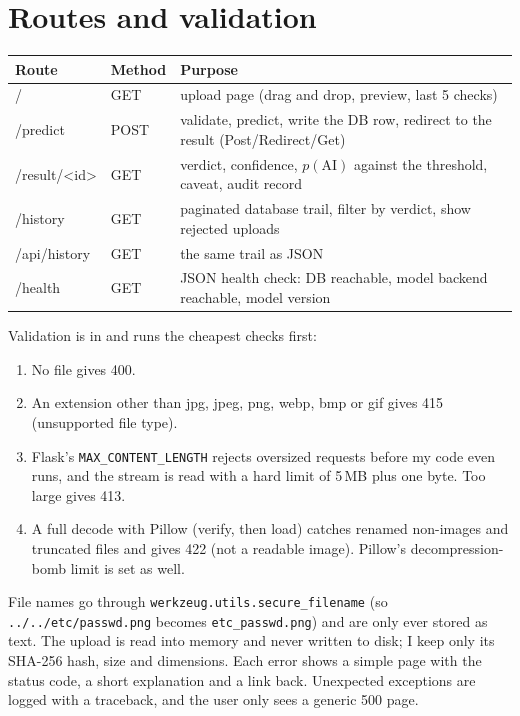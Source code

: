 
\section{Routes and validation}
\begin{tabularx}{\linewidth}{>{\ttfamily}l l X}
\toprule
Route & Method & Purpose \\
\midrule
/ & GET & upload page (drag and drop, preview, last 5 checks) \\
/predict & POST & validate, predict, write the DB row, redirect to the result (Post/Redirect/Get) \\
/result/<id> & GET & verdict, confidence, $p(\text{AI})$ against the threshold, caveat, audit record \\
/history & GET & paginated database trail, filter by verdict, show rejected uploads \\
/api/history & GET & the same trail as JSON \\
/health & GET & JSON health check: DB reachable, model backend reachable, model version \\
\bottomrule
\end{tabularx}

Validation is in  and runs the cheapest checks first:
\begin{enumerate}
\item No file gives 400.
\item An extension other than jpg, jpeg, png, webp, bmp or gif gives 415 (unsupported file type).
\item Flask's \texttt{MAX\_CONTENT\_LENGTH} rejects oversized requests before my code even runs, and
the stream is read with a hard limit of 5\,MB plus one byte. Too large gives 413.
\item A full decode with Pillow (verify, then load) catches renamed non-images and truncated files
and gives 422 (not a readable image). Pillow's decompression-bomb limit is set as well.
\end{enumerate}
File names go through \texttt{werkzeug.utils.secure\_filename} (so \texttt{../../etc/passwd.png}
becomes \texttt{etc\_passwd.png}) and are only ever stored as text. The upload is read into memory
and never written to disk; I keep only its SHA-256 hash, size and dimensions. Each error shows a
simple page with the status code, a short explanation and a link back. Unexpected exceptions are
logged with a traceback, and the user only sees a generic 500 page.

